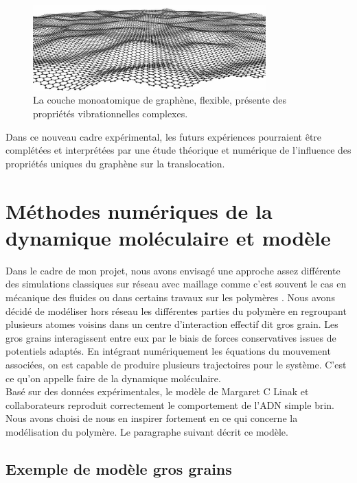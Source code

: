\documentclass[a4paper,11pt]{article}
\begin{document}
\begin{figure}[H]
\begin{center}
\includegraphics[width=0.8\textwidth]{vib.jpg} 
\caption{La couche monoatomique de graphène, flexible, présente des propriétés vibrationnelles complexes.}
\label{vib}
\end{center}
\end{figure}

Dans ce nouveau cadre expérimental, les futurs expériences pourraient être complétées et interprétées par une étude théorique et numérique de l'influence des propriétés uniques du graphène sur la translocation.


\newpage
\section{Méthodes numériques de la dynamique moléculaire et modèle}



Dans le cadre de mon projet, nous avons envisagé une approche assez différente des simulations classiques sur réseau avec maillage comme c'est souvent le cas en mécanique des fluides ou dans certains travaux sur les polymères \cite{these}. Nous avons décidé de modéliser hors réseau les différentes parties du polymère en regroupant plusieurs atomes voisins dans un centre d'interaction effectif dit gros grain. Les gros grains interagissent entre eux par le biais de forces conservatives issues de potentiels adaptés. En intégrant numériquement les équations du mouvement associées, on est capable de produire plusieurs trajectoires pour le système. C'est ce qu'on appelle faire de la dynamique moléculaire.\\

Basé sur des données expérimentales, le modèle de Margaret C Linak et collaborateurs \cite{jchem} reproduit correctement le comportement de l'ADN simple brin. Nous avons choisi de nous en inspirer fortement en ce qui concerne la modélisation du polymère. Le paragraphe suivant décrit ce modèle.

\subsection{Exemple de modèle gros grains}
\end{document}
